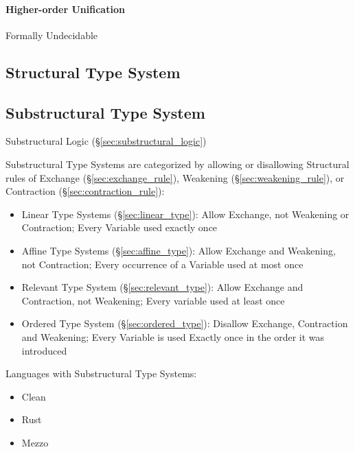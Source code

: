 \paragraph{Higher-order Unification}
\label{sec:higherorder_unification}

Formally Undecidable



\subsection{Structural Type System}\label{sec:structural_type_system}

\subsection{Substructural Type System}
\label{sec:substructural_type}

Substructural Logic (\S\ref{sec:substructural_logic})

Substructural Type Systems are categorized by allowing or disallowing
Structural rules of Exchange (\S\ref{sec:exchange_rule}), Weakening
(\S\ref{sec:weakening_rule}), or Contraction
(\S\ref{sec:contraction_rule}):

\begin{itemize}
  \item Linear Type Systems (\S\ref{sec:linear_type}): Allow Exchange,
    not Weakening or Contraction; Every Variable used exactly once
  \item Affine Type Systems (\S\ref{sec:affine_type}): Allow Exchange
    and Weakening, not Contraction; Every occurrence of a Variable
    used at most once
  \item Relevant Type System (\S\ref{sec:relevant_type}): Allow
    Exchange and Contraction, not Weakening; Every variable used at
    least once
  \item Ordered Type System (\S\ref{sec:ordered_type}): Disallow
    Exchange, Contraction and Weakening; Every Variable is used
    Exactly once in the order it was introduced
\end{itemize}

Languages with Substructural Type Systems:

\begin{itemize}
  \item Clean
  \item Rust
  \item Mezzo
\end{itemize}

